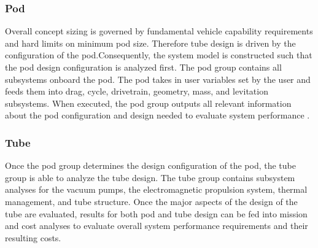 \subsubsection{Pod}
	Overall concept sizing is governed by fundamental vehicle capability requirements
	and hard limits on minimum pod size. Therefore tube design is driven by the configuration of the pod.Consequently, the system model is constructed such that the pod design configuration is analyzed first. The pod group contains all subsystems onboard the pod. The pod takes in user variables set by the user and feeds them into drag, cycle, drivetrain, geometry, mass, and levitation subsystems. When executed, the pod group outputs all relevant information about the pod configuration and design needed to evaluate system performance .
\subsubsection{Tube}
	Once the pod group determines the design configuration of the pod, the tube group is able to analyze the tube design. The tube group contains subsystem analyses for the vacuum pumps, the electromagnetic propulsion system, thermal management, and tube structure. Once the major aspects of the design of the tube are evaluated, results for both pod and tube design can be fed into mission and cost analyses to evaluate overall system performance requirements and their resulting costs.
